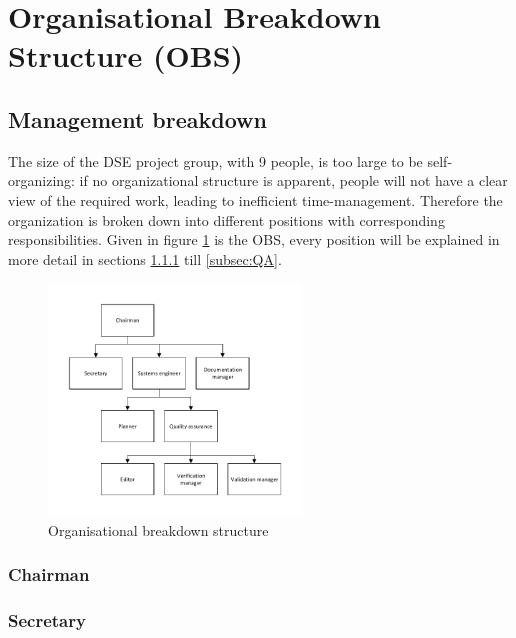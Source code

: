 \section{Organisational Breakdown Structure (OBS)}\label{cha:OBS}

\subsection{Management breakdown}
The size of the DSE project group, with 9 people, is too large to be self-organizing: if no organizational structure is apparent, people will not have a clear view of the required work, leading to inefficient time-management. Therefore the organization is broken down into different positions with corresponding responsibilities. Given in figure \ref{fig:OBS} is the OBS, every position will be explained in more detail in sections \ref{subsec:Chairman} till \ref{subsec:QA}.

\begin{figure}[h]
\centering
\includegraphics[width=0.6\textwidth]{./Figure/OBS.pdf}
\caption{Organisational breakdown structure} \label{fig:OBS}
\end{figure}

\subsubsection{Chairman}\label{subsec:Chairman}


\subsubsection{Secretary}\label{subsec:Secretary}


